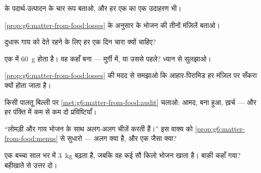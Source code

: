 \begin{exercise}[$\star$]\label{exo:g6:matter-from-food:3}
 के पदार्थ-उत्पादन के चार रूप बताओ, और हर एक का एक उदाहरण भी।
\end{exercise}

\begin{exercise}[$\star$]\label{exo:g6:matter-from-food:4}
\cref{prop:g6:matter-from-food:losses} के अनुसार  के भोजन की
तीनों मंज़िलें बताओ।
\end{exercise}

\begin{exercise}[$\star$]\label{exo:g6:matter-from-food:5}
दुधारू गाय को  देते रहने के लिए हर एक दिन चारा क्यों चाहिए?
\end{exercise}

\begin{exercise}[$\star$]\label{exo:g6:matter-from-food:6}
एक  में \qty{60}{g}  होता है। वह कहाँ बना ---
मुर्ग़ी में, या उससे पहले? ध्यान से सुलझाओ।
\end{exercise}

\begin{exercise}[$\star\star$]\label{exo:g6:matter-from-food:7}
\cref{prop:g6:matter-from-food:losses} की मदद से समझाओ कि आहार-पिरामिड
हर मंज़िल पर सँकरा क्यों होता जाता है।
\end{exercise}

\begin{exercise}[$\star\star$]\label{exo:g6:matter-from-food:8}
किसी पालतू बिल्ली पर \cref{met:g6:matter-from-food:audit} चलाओ: आमद,
बना हुआ, ख़र्च --- और हर पंक्ति में कम से कम दो प्रविष्टियाँ।
\end{exercise}

\begin{exercise}[$\star\star$]\label{exo:g6:matter-from-food:9}
``लोमड़ी और गाय भोजन के साथ अलग-अलग चीज़ें करती हैं।'' इस वाक्य को
\cref{prop:g6:matter-from-food:menus} से सुधारो --- अलग क्या है, और
एक जैसा क्या?
\end{exercise}

\begin{exercise}[$\star\star$]\label{exo:g6:matter-from-food:10}
एक बच्चा साल भर में \qty{3}{kg} बढ़ता है, जबकि वह कई सौ किलो भोजन खाता
है। बाक़ी कहाँ गया? बहीखाते से उत्तर दो।
\end{exercise}

